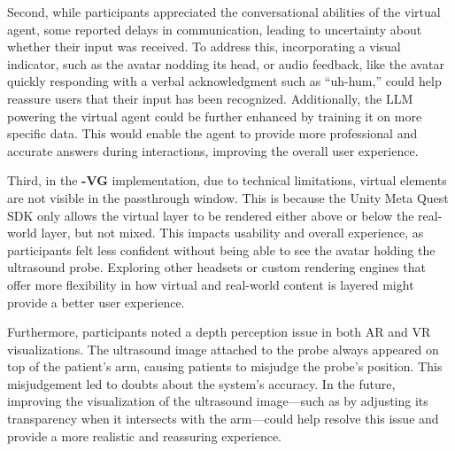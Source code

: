 Second, while participants appreciated the conversational abilities of the virtual agent, some reported delays in communication, leading to uncertainty about whether their input was received. To address this, incorporating a visual indicator, such as the avatar nodding its head, or audio feedback, like the avatar quickly responding with a verbal acknowledgment such as “uh-hum,” could help reassure users that their input has been recognized. Additionally, the LLM powering the virtual agent could be further enhanced by training it on more specific data. This would enable the agent to provide more professional and accurate answers during interactions, improving the overall user experience.

Third, in the \textbf{-VG} implementation, due to technical limitations, virtual elements are not visible in the passthrough window. This is because the Unity Meta Quest SDK only allows the virtual layer to be rendered either above or below the real-world layer, but not mixed. This impacts usability and overall experience, as participants felt less confident without being able to see the avatar holding the ultrasound probe. Exploring other headsets or custom rendering engines that offer more flexibility in how virtual and real-world content is layered might provide a better user experience.

Furthermore, participants noted a depth perception issue in both AR and VR visualizations. The ultrasound image attached to the probe always appeared on top of the patient’s arm, causing patients to misjudge the probe’s position. This misjudgement led to doubts about the system’s accuracy. In the future, improving the visualization of the ultrasound image—such as by adjusting its transparency when it intersects with the arm—could help resolve this issue and provide a more realistic and reassuring experience.
